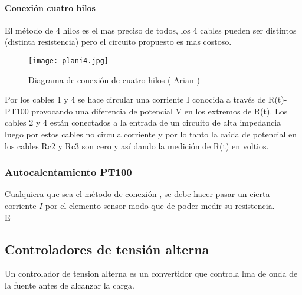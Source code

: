 \documentclass[Spanish,12pt,doublespace,german,letterpaper,dvipdfm]{article}
\begin{document}
\paragraph{Conexión cuatro hilos}
El método de 4 hilos es el mas preciso de todos, los 4 cables
pueden ser distintos (distinta resistencia) pero el circuito
propuesto es mas costoso.
\begin{figure}[h!]
\begin{center}
 \texttt{[image: plani4.jpg]}
\end{center}
\caption{Diagrama de conexión de cuatro hilos  ( Arian ) }
\end{figure}
Por los cables 1 y 4 se hace circular una corriente I conocida a
través de R(t)-PT100 provocando una diferencia de potencial V en
los extremos de R(t). Los cables 2 y 4 están conectados a la
entrada de un circuito de alta impedancia luego por estos cables
no circula corriente y por lo tanto la caída de potencial en los
cables Rc2 y Rc3 son cero y así dando la medici\'on  de R(t) en
voltios.

\subsubsection{Autocalentamiento PT100} Cualquiera que sea el
método de conexión , se debe hacer pasar un cierta corriente $I$
por el elemento sensor modo que de poder medir su resistencia.\\
E
\subsection{Controladores de tensi\'on alterna }
Un controlador de tension alterna es un convertidor que controla
lma de onda de la fuente antes de
alcanzar la carga.
\end{document}
